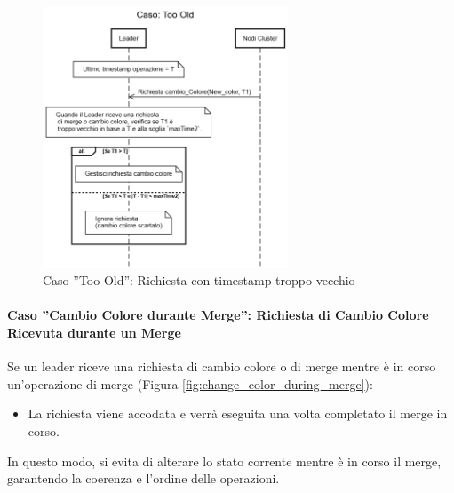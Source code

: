 \documentclass[12pt, a4paper]{report}
\begin{document}
\begin{figure}[H]
    \centering
    \includegraphics[width=0.65\textwidth,align=t]{images/concorrenza/too_old.png}
    \caption{Caso ''Too Old'': Richiesta con timestamp troppo vecchio}
    \label{fig:caso_too_old}
\end{figure}

\newpage
\paragraph{Caso ''Cambio Colore durante Merge'': Richiesta di Cambio Colore Ricevuta durante un Merge}\label{par:change_color_during_merge}

Se un leader riceve una richiesta di cambio colore o di merge mentre è in corso un'operazione di merge (Figura \ref{fig:change_color_during_merge}):

\begin{itemize}
    \item La richiesta viene accodata e verrà eseguita una volta completato il merge in corso.
\end{itemize}

In questo modo, si evita di alterare lo stato corrente mentre è in corso il merge, garantendo la coerenza e l'ordine delle operazioni.
\end{document}
